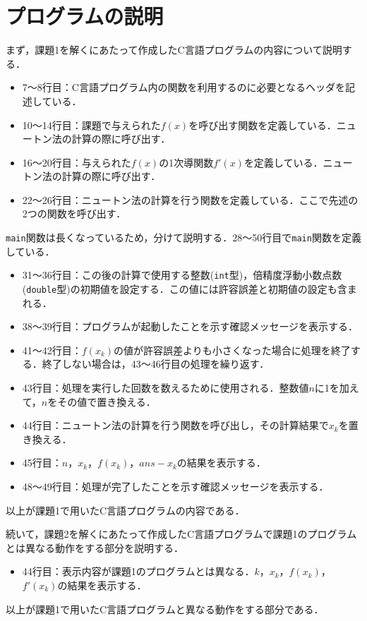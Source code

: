 \documentclass[12pt]{jarticle}
\renewcommand  \[  {\begin{eqnarray}}
\renewcommand  \]  {\end{eqnarray}}
\begin{document}
\section{プログラムの説明}
まず，課題1を解くにあたって作成したC言語プログラムの内容について説明する．
\begin{itemize}
\item{7〜8行目：C言語プログラム内の関数を利用するのに必要となるヘッダを記述している．}
\item{10〜14行目：課題で与えられた$f(x)$を呼び出す関数を定義している．ニュートン法の計算の際に呼び出す．}
\item{16〜20行目：与えられた$f(x)$の1次導関数$f\prime(x)$を定義している．ニュートン法の計算の際に呼び出す．}
\item{22〜26行目：ニュートン法の計算を行う関数を定義している．ここで先述の2つの関数を呼び出す．}
\end{itemize}
\verb|main|関数は長くなっているため，分けて説明する．28〜50行目で\verb|main|関数を定義している．
\begin{itemize}
\item{31〜36行目：この後の計算で使用する整数(\verb|int|型)，倍精度浮動小数点数(\verb|double|型)の初期値を設定する．この値には許容誤差と初期値の設定も含まれる．}
\item{38〜39行目：プログラムが起動したことを示す確認メッセージを表示する．}
\item{41〜42行目：$f(x_k)$の値が許容誤差よりも小さくなった場合に処理を終了する．終了しない場合は，43〜46行目の処理を繰り返す．}
\item{43行目：処理を実行した回数を数えるために使用される．整数値$n$に1を加えて，$n$をその値で置き換える．}
\item{44行目：ニュートン法の計算を行う関数を呼び出し，その計算結果で$x_k$を置き換える．}
\item{45行目：$n$，$x_k$，$f(x_k)$，$ans-x_k$の結果を表示する．}
\item{48〜49行目：処理が完了したことを示す確認メッセージを表示する．}
\end{itemize}
以上が課題1で用いたC言語プログラムの内容である．


続いて，課題2を解くにあたって作成したC言語プログラムで課題1のプログラムとは異なる動作をする部分を説明する．
\begin{itemize}
\item{44行目：表示内容が課題1のプログラムとは異なる．$k$，$x_k$，$f(x_k)$，$f\prime(x_k)$の結果を表示する．}
\end{itemize}
以上が課題1で用いたC言語プログラムと異なる動作をする部分である．
\end{document}
